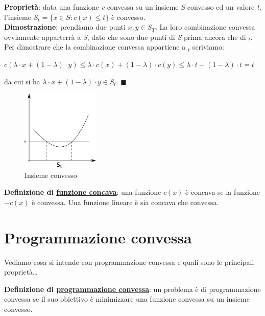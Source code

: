 \documentclass[11pt, oneside]{book}
\begin{document}
\par\bigskip

{\bf Propriet\`a}: data una funzione {\em c} convessa su un insieme {\em S}
convesso ed un valore {\em t}, l'insieme $S_t = \{ x \in S : c(x) \leq
t\}$ \`e convesso.\\
{\bf Dimostrazione}: prendiamo due punti $x,y \in S_T$. La loro
combinazione convessa ovviamente apparterr\`a a {\em S}, dato che sono
due punti di {\em S} prima ancora che di $_t$. Per dimostrare che la
combinazione convessa appartiene a $_t$ scriviamo:

\begin{center}
$c(\lambda\cdot x + (1-\lambda)\cdot y) \leq \lambda\cdot c(x) +
  (1-\lambda)\cdot c(y) \leq \lambda\cdot t +
  (1-\lambda)\cdot t = t$
\end{center}

\noindent da cui si ha $\lambda\cdot x + (1-\lambda)\cdot y \in S_t$.
$\blacksquare$

\begin{figure}[H]
  \centering
  \includegraphics[width=0.33\textwidth]{images/insiemeconvesso.png}
  \caption{Insieme convesso}
  \label{insiemeconvesso}
\end{figure}

\par\bigskip

{\bf Definizione di \underline{funzione concava}}: una funzione $c(x)$
\`e concava se la funzione $-c(x)$ \`e convessa. Una funzione lineare
\`e sia concava che convessa.

\section{Programmazione convessa}

Vediamo cosa si intende con programmazione convessa e quali sono le
principali propriet\`a\dots

\par\bigskip

{\bf Definizione di \underline{programmazione convessa}}: un problema
\`e di programmazione convessa se il suo obiettivo \`e minimizzare una
funzione convessa su un insieme convesso.
\end{document}
